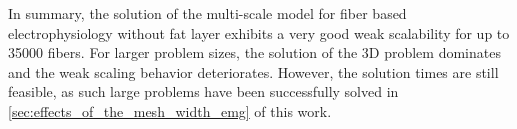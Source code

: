 In summary, the solution of the multi-scale model for fiber based electrophysiology without fat layer exhibits a very good weak scalability for up to \num{35000} fibers. For larger problem sizes, the solution of the 3D problem dominates and the weak scaling behavior deteriorates. However, the solution times are still feasible, as such large problems have been successfully solved in \cref{sec:effects_of_the_mesh_width_emg} of this work.




